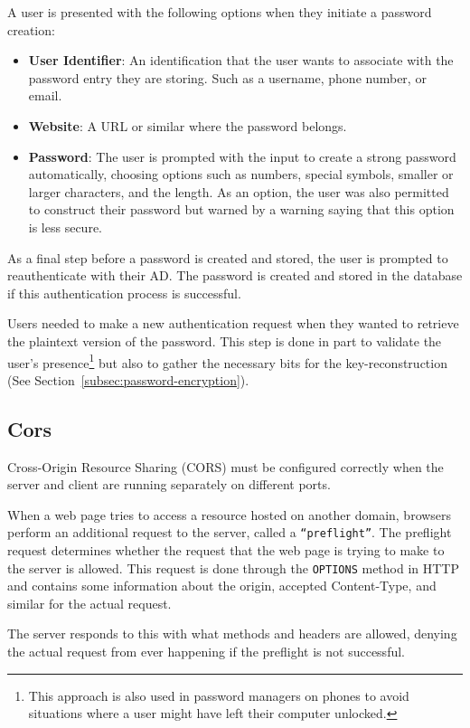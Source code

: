 A user is presented with the following options when they initiate a password
creation:

\begin{itemize}
  \item \textbf{User Identifier}: An identification that the user wants to
  associate with the password entry they are storing.
  Such as a username, phone number, or email.
  \item \textbf{Website}: A URL or similar where the password belongs.
  \item \textbf{Password}: The user is prompted with the input to create a
  strong password automatically, choosing options such as numbers, special
  symbols, smaller or larger characters, and the length.
  As an option, the user was also permitted to construct their password but
  warned by a warning saying that this option is less secure.
\end{itemize}

As a final step before a password is created and stored, the user is prompted to
reauthenticate with their AD\@.
The password is created and stored in the database if this authentication
process is successful.

Users needed to make a new authentication request when they wanted to retrieve
the plaintext version of the password.
This step is done in part to validate the user's presence\footnote{
  This approach is also used in password managers on phones to avoid situations
  where a user might have left their computer unlocked.
} but also to gather the necessary bits for the key-reconstruction
(See Section~\ref{subsec:password-encryption}).

\subsection{Cors}\label{subsec:cors}
Cross-Origin Resource Sharing (CORS) must be configured correctly when the
server and client are running separately on different ports.

When a web page tries to access a resource hosted on another domain, browsers
perform an additional request to the server, called a \texttt{``preflight''}.
The preflight request determines whether the
request that the web page is trying to make to the server is allowed.
This request is done through the \texttt{OPTIONS} method in HTTP and contains
some information about the origin, accepted Content-Type, and similar for the
actual request.

The server responds to this with what methods and headers are allowed, denying
the actual request from ever happening if the preflight is not successful.


